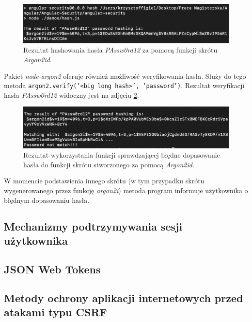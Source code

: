 \begin{figure}[h]
	\centering\includegraphics[scale=0.73]{images/security/argon2id.png}
	\caption{Rezultat hashowania hasła \textit{PAssw0rd12} za pomocą funkcji skrótu \textit{Argon2id}.}
	\label{Rys:argon2id}
\end{figure}

Pakiet \textit{node-argon2} oferuje również możliwość weryfikowania hasła. Służy do tego metoda \texttt{argon2.verify('<big long hash>', 'password')}. Rezultat weryfikacji hasła \textit{PAssw0rd12} widoczny jest na zdjęciu \ref{Rys:argon2idmatchfailed}.

\begin{figure}[h]
	\centering\includegraphics[scale=0.73]{images/security/argon-matching-failed.png}
	\caption{Rezultat wykorzystania funkcji sprawdzającej błędne dopasowanie hasła do funkcji skrótu stworzonego za pomocą \textit{Argon2id}.}
	\label{Rys:argon2idmatchfailed}
\end{figure}

W momencie podstawienia innego skrótu (w tym przypadku skrótu wygenerowanego przez funkcję \textit{argon2i}) metoda program informuje użytkownika o błędnym dopasowaniu hasła. 

\subsection{Mechanizmy podtrzymywania sesji użytkownika}

\subsection{JSON Web Tokens}

\subsection{Metody ochrony aplikacji internetowych przed atakami typu CSRF}

